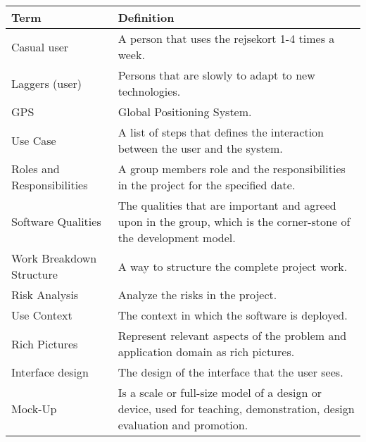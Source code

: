 \renewcommand{\headrulewidth}{0.1pt}
\renewcommand{\footrulewidth}{0.1pt}


\begin{center}
	\def\arraystretch{1.5}%
    \begin{tabular}{ | p{5cm} | p{5cm} |}
    \hline 
	\textbf{Term} & \textbf{Definition} \\ \hline
	
	Casual user & A person that  uses the rejsekort 1-4 times a week. \\ \hline
	
	Laggers (user)  & Persons that are slowly to adapt to new technologies. \\ \hline
	
	GPS & Global Positioning System.\\ \hline
	
	Use Case & A list of steps that defines the interaction between the user and the system. \\ \hline
	
	Roles and Responsibilities  & A group members role and the responsibilities in the project for the specified date. \\ \hline
	
	Software Qualities & The qualities that are important and agreed upon in the group, which is the corner-stone of the development model. \\ \hline
	
	Work Breakdown Structure & A way to structure the complete project work. \\ \hline
	
	Risk Analysis & Analyze the risks in the project. \\ \hline
	
	Use Context & The context in which the software is deployed. \\ \hline
	
	Rich Pictures & Represent relevant aspects of the problem and application domain as rich pictures. \\ \hline
	
	Interface design  & The design of the interface that the user sees. \\ \hline
	
	Mock-Up & Is a scale or full-size model of a design or device, used for teaching, demonstration, design evaluation and promotion. \\

    \hline
    \end{tabular}
\end{center}